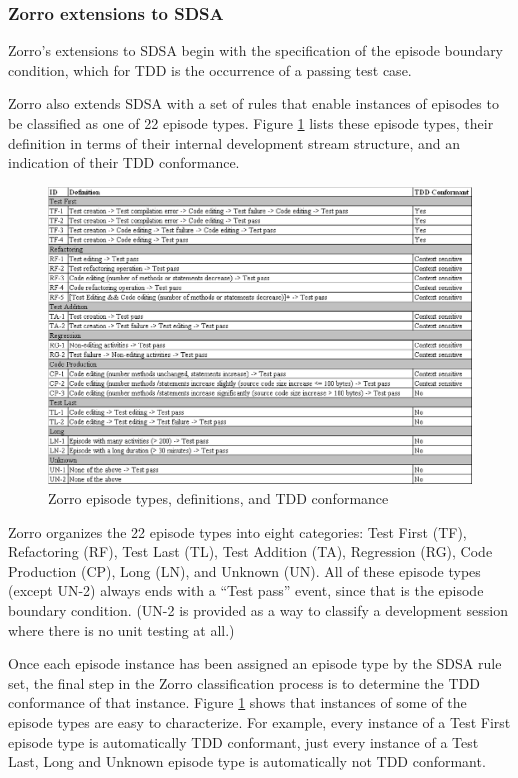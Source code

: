 \documentclass[11pt,twocolumn]{article}
\begin{document}
\subsubsection{Zorro extensions to SDSA}

Zorro's extensions to SDSA begin with the specification of the episode
boundary condition, which for TDD is the occurrence of a passing test case.

Zorro also extends SDSA with a set of rules that enable instances of
episodes to be classified as one of 22 episode types.  Figure
\ref{fig:Categories} lists these episode types, their definition in terms
of their internal development stream structure, and an indication of their
TDD conformance.

\begin{figure}[th]
  \center
  \includegraphics[width=1.0\textwidth]{episode-classification.eps}
  \caption{Zorro episode types, definitions, and TDD conformance}
  \label{fig:Categories}
\end{figure} 

Zorro organizes the 22 episode types into eight categories: Test First
(TF), Refactoring (RF), Test Last (TL), Test Addition (TA), Regression
(RG), Code Production (CP), Long (LN), and Unknown (UN).  All of these
episode types (except UN-2) always ends with a ``Test pass'' event, since that
is the episode boundary condition.  (UN-2 is provided as a way to classify
a development session where there is no unit testing at all.)

Once each episode instance has been assigned an episode type by the SDSA
rule set, the final step in the Zorro classification process is to
determine the TDD conformance of that instance.  Figure
\ref{fig:Categories} shows that instances of some of the episode types are
easy to characterize. For example, every instance of a Test First episode
type is automatically TDD conformant, just every instance of a Test Last,
Long and Unknown episode type is automatically not TDD conformant.
\end{document}
